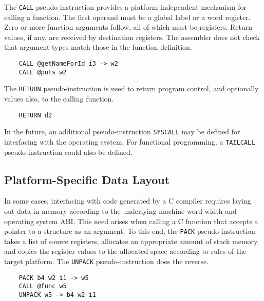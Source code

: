 The \texttt{CALL} pseudo-instruction provides a platform-independent
mechanism for calling a function. The first operand must be
a global label or a word register. Zero or more function arguments follow,
all of which must be registers. Return values, if any, are received
by destination registers.
The assembler does not check that argument types match those
in the function definition.

\begin{verbatim}
    CALL @getNameForId i3 -> w2
    CALL @puts w2
\end{verbatim}

The \texttt{RETURN} pseudo-instruction is used to return program
control, and optionally values also, to the calling function.

\begin{verbatim}
    RETURN d2
\end{verbatim}

In the future, an additional pseudo-instruction \texttt{SYSCALL}
may be defined for interfacing with the operating system.
For functional programming, a \texttt{TAILCALL} pseudo-instruction
could also be defined.

\subsection{Platform-Specific Data Layout}

In some cases, interfacing with code generated by a C compiler
requires laying out data in memory according to the
underlying machine word width and operating system ABI.
This need arises when calling a C function that accepts
a pointer to a structure as an argument.
To this end, the \texttt{PACK} pseudo-instruction takes a list
of source registers, allocates an appropriate amount of stack memory,
and copies the register values to the allocated space according
to rules of the target platform. The \texttt{UNPACK} pseudo-instruction
does the reverse.

\begin{verbatim}
    PACK b4 w2 i1 -> w5
    CALL @func w5
    UNPACK w5 -> b4 w2 i1
\end{verbatim}
